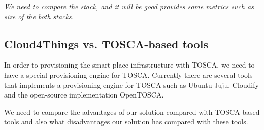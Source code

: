 \textit{We need to compare the stack, and it will be good provides some metrics such as size of the
both stacks.}\\

\subsection{Cloud4Things vs. TOSCA-based tools}
\label{sub:c4t_vs_tosca}

In order to provisioning the smart place infrastructure with TOSCA, we need to have a special
provisioning engine for TOSCA. Currently there are several tools that implements
a provisioning engine for TOSCA such as Ubuntu Juju, Cloudify and the open-source
implementation OpenTOSCA.

We need to compare the advantages of our solution compared with TOSCA-based tools and also
what disadvantages our solution has compared with these tools.
